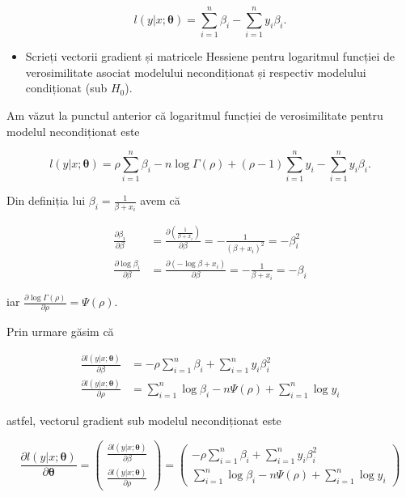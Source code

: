 \documentclass[]{article}
\newenvironment{frshaded*}{%
  \def\FrameCommand{\fboxrule=\FrameRule\fboxsep=\FrameSep \fcolorbox{framecolor}{shadecolor1}}%
  \MakeFramed {\advance\hsize-\width \FrameRestore}}%
{\endMakeFramed}
\newenvironment{rmdblock}[1]
  {\begin{frshaded*}
  \begin{itemize}
  \renewcommand{\labelitemi}{
    \raisebox{-.7\height}[0pt][0pt]{
      {\setkeys{Gin}{width=2em,keepaspectratio}\texttt{[image: images/icons/\#1]}}
    }
  }
  \item
  }
  {
  \end{itemize}
  \end{frshaded*}
  }
\newenvironment{rmdexercise}
  {\begin{rmdblock}{exercise}}
  {\end{rmdblock}}
\begin{document}
\[
  l(y|x;\boldsymbol{\theta}) = \sum_{i = 1}^{n}\beta_i - \sum_{i = 1}^{n}y_i\beta_i.
\]

\begin{rmdexercise}
Scrieți vectorii gradient și matricele Hessiene pentru logaritmul
funcției de verosimilitate asociat modelului necondiționat și respectiv
modelului condiționat (sub \(H_0\)).
\end{rmdexercise}

Am văzut la punctul anterior că logaritmul funcției de verosimilitate
pentru modelul necondiționat este

\[
  l(y|x;\boldsymbol{\theta}) = \rho\sum_{i = 1}^{n}\beta_i - n\log{\Gamma(\rho)} + (\rho - 1)\sum_{i = 1}^{n}y_i - \sum_{i = 1}^{n}y_i\beta_i.
\]

Din definiția lui \(\beta_i = \frac{1}{\beta+x_i}\) avem că

\begin{align*}
  \frac{\partial\beta_i}{\partial \beta} &= \frac{\partial\left(\frac{1}{\beta+x_i}\right)}{\partial \beta} = -\frac{1}{(\beta + x_i)^2} = -\beta_i^2\\
  \frac{\partial\log{\beta_i}}{\partial \beta} &= \frac{\partial(-\log{\beta+x_i})}{\partial \beta} = -\frac{1}{\beta + x_i} = -\beta_i
\end{align*}

iar \(\frac{\partial\log{\Gamma(\rho)}}{\partial \rho} = \Psi(\rho)\).

Prin urmare găsim că

\begin{align*}
  \frac{\partial l(y|x;\boldsymbol{\theta})}{\partial \beta} &= -\rho\sum_{i=1}^{n}\beta_i + \sum_{i=1}^{n}y_i\beta_i^2\\
  \frac{\partial l(y|x;\boldsymbol{\theta})}{\partial \rho} &= \sum_{i=1}^{n}\log{\beta_i} - n\Psi(\rho) + \sum_{i=1}^{n}\log{y_i}
\end{align*}

astfel, vectorul gradient sub modelul necondiționat este

\[
\frac{\partial l(y|x;\boldsymbol{\theta})}{\partial \boldsymbol{\theta}} = \begin{pmatrix}
  \frac{\partial l(y|x;\boldsymbol{\theta})}{\partial \beta}\\
  \frac{\partial l(y|x;\boldsymbol{\theta})}{\partial \rho}
\end{pmatrix} = \begin{pmatrix}
  -\rho\sum_{i=1}^{n}\beta_i + \sum_{i=1}^{n}y_i\beta_i^2\\
  \sum_{i=1}^{n}\log{\beta_i} - n\Psi(\rho) + \sum_{i=1}^{n}\log{y_i}
\end{pmatrix}
\]
\end{document}
